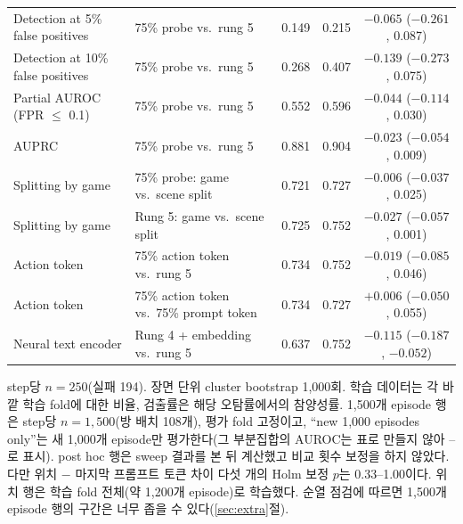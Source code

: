 \begin{table}[htbp]
\begin{tabularx}{\linewidth}{@{}LLccc@{}}
Detection at 5\% false positives & 75\% probe vs.\ rung 5 & 0.149 & 0.215 & $-0.065$ ($-0.261$, 0.087) \\
Detection at 10\% false positives & 75\% probe vs.\ rung 5 & 0.268 & 0.407 & $-0.139$ ($-0.273$, 0.075) \\
Partial AUROC (FPR $\le$ 0.1) & 75\% probe vs.\ rung 5 & 0.552 & 0.596 & $-0.044$ ($-0.114$, 0.030) \\
AUPRC & 75\% probe vs.\ rung 5 & 0.881 & 0.904 & $-0.023$ ($-0.054$, 0.009) \\
Splitting by game & 75\% probe: game vs.\ scene split & 0.721 & 0.727 & $-0.006$ ($-0.037$, 0.025) \\
Splitting by game & Rung 5: game vs.\ scene split & 0.725 & 0.752 & $-0.027$ ($-0.057$, 0.001) \\
Action token & 75\% action token vs.\ rung 5 & 0.734 & 0.752 & $-0.019$ ($-0.085$, 0.046) \\
Action token & 75\% action token vs.\ 75\% prompt token & 0.734 & 0.727 & $+0.006$ ($-0.050$, 0.055) \\
Neural text encoder & Rung 4 + embedding vs.\ rung 5 & 0.637 & 0.752 & $-0.115$ ($-0.187$, $-0.052$) \\
\bottomrule
\end{tabularx}
\par\smallskip\raggedright\footnotesize
step당 $n = 250$(실패 194). 장면 단위 cluster bootstrap 1,000회. 학습 데이터는 각 바깥 학습 fold에 대한 비율, 검출률은 해당 오탐률에서의 참양성률. 1,500개 episode 행은 step당 $n = 1{,}500$(방 배치 108개), 평가 fold 고정이고, ``new 1,000 episodes only''는 새 1,000개 episode만 평가한다(그 부분집합의 AUROC는 표로 만들지 않아 --로 표시). post hoc 행은 sweep 결과를 본 뒤 계산했고 비교 횟수 보정을 하지 않았다. 다만 위치 $-$ 마지막 프롬프트 토큰 차이 다섯 개의 Holm 보정 $p$는 0.33--1.00이다. 위치 행은 학습 fold 전체(약 1,200개 episode)로 학습했다. 순열 점검에 따르면 1,500개 episode 행의 구간은 너무 좁을 수 있다(\ref{sec:extra}절).
\end{table}
